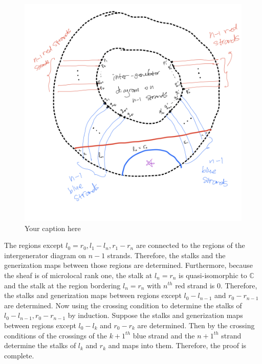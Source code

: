 \begin{figure}[H] %
    \centering
    \includegraphics[width=\linewidth]{diagrams/definition14-3/3.png} %
    \caption{Your caption here}
    \label{fig:your-label}
\end{figure}

The regions except $l_0 = r_0, l_1 - l_n, r_1 - r_n$ are connected to the regions of the intergenerator diagram on $n-1$ strands. Therefore, the stalks and the generization maps between those regions are determined. Furthermore, because the sheaf is of microlocal rank one, the stalk at $l_n = r_n$ is quasi-isomorphic to $\mathbb{C}$ and the stalk at the region bordering $l_n = r_n$ with $n^{th}$ red strand is $0$. Therefore, the stalks and generization maps between regions except $l_0 - l_{n-1}$ and $r_0 - r_{n-1}$ are determined. Now using the crossing condition to determine the stalks of $l_0 - l_{n-1}, r_0 - r_{n-1}$ by induction. Suppose the stalks and generization maps between regions except $l_0 - l_k$ and $r_0 - r_k$ are determined. Then by the crossing conditions of the crossings of the $k+1^{th}$ blue strand and the $n+1^{th}$ strand determine the stalks of $l_k$ and $r_k$ and maps into them. Therefore, the proof is complete.